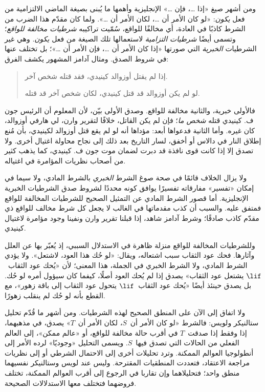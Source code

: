 \documentclass[../../../include/open-logic-section]{subfiles}
\begin{document}


ومن أشهر صيغ «إذا \dots، فإن \dots» الإنجليزية وأهمها ما يُبنى بصيغة
الماضي الالتزامية من فعل \emph{يكون}: «لو كان الأمر أن \dots، لكان
الأمر أن \dots». ولما كان مقدّم هذا الضرب من الشرط كاذبًا في العادة،
أي مخالفًا للواقع، سُمّيت تراكيبه \emph{شرطيات مخالفة للواقع}؛ وتسمى
أيضًا \emph{شرطيات التزامية} لاستعمالها تلك الصيغة من فعل \emph{يكون}.
وهي غير الشرطيات \emph{الخبرية} التي صورتها «إذا كان الأمر أن \dots،
فإن الأمر أن \dots»؛ بل تختلف عنها في شروط الصدق. ومثال آدامز المشهور
يكشف الفرق:
\begin{quote}
  إذا لم يقتل أوزوالد كينيدي، فقد قتله شخص آخر.
  
  لو لم يكن أوزوالد قد قتل كينيدي، لكان شخص آخر قد قتله.
\end{quote}
فالأولى خبرية، والثانية مخالفة للواقع. وصدق الأولى بيّن، لأن المعلوم أن
الرئيس جون ف. كينيدي قتله \emph{شخص ما}؛ فإن لم يكن القاتل، خلافًا
لتقرير وارن، لي هارفي أوزوالد، كان غيره. وأما الثانية فدعواها أبعد:
مؤداها أنه لو لم يقع قتل أوزوالد لكينيدي، بأن مُنع إطلاق النار في دالاس
أو أخفق، لسار التاريخ بعد ذلك إلى نجاح محاولة اغتيال أخرى. ولا تصدق
إلا إذا كانت قوى نافذة قد دبرت لضمان موت جون ف. كينيدي، كما يذهب كثير
من أصحاب نظريات المؤامرة في اغتياله.

ولا يزال الخلاف قائمًا في صحة صوغ الشرط \emph{الخبري} بالشرط المادي،
ولا سيما في إمكان «تفسير» مفارقاته تفسيرًا يوافق كونه محددًا لشروط صدق
الشرطيات الخبرية الإنجليزية. أما قصور الشرط المادي عن التمثيل الصحيح
للشرطيات المخالفة للواقع فمتفق عليه. والسبب أن كذب مقدماتها في الغالب
لا يجعل كل شرط مخالف للواقع ذي مقدّم كاذب صادقًا؛ وشرط آدامز شاهد، إذا
قبلنا تقرير وارن ونفينا وجود مؤامرة لاغتيال كينيدي.

وللشرطيات المخالفة للواقع منزلة ظاهرة في الاستدلال السببي، إذ يُعبّر
بها عن العلل وآثارها. فحك عود الثقاب سبب اشتعاله، ويقال: «لو حُك هذا
العود، لاشتعل». ولا يؤدي الشرط المادي، ولا الشرط الخبري في الجملة، هذا
المعنى؛ لأن «يُحك عود الثقاب~$\lif$ يشتعل عود الثقاب» يصدق إذا لم
يُحك العود أصلًا، كيفما كان سيؤول أمره لو حُك. بل يصدق حينئذ أيضًا
«يُحك عود الثقاب~$\lif$ يتحول عود الثقاب إلى باقة زهور»، مع القطع بأنه
لو حُك لم ينقلب زهورًا.

ولا اتفاق إلى الآن على المنطق الصحيح لهذه الشرطيات. ومن أشهر ما قُدّم
تحليل ستالنيكر ولويس: فالشرط «لو كان الأمر أن~$S$، لكان الأمر أن~$T$»
يصدق، في مذهبهما، إذا وفقط إذا صدقت~$T$ في أقرب حالة مخالفة للواقع، أو
«عالم ممكن»، إلى العالم الفعلي من الحالات التي تصدق فيها~$S$. ويسمى
التحليل «وجوديًا» لرده الأمر إلى أنطولوجيا العوالم الممكنة. وترد تحليلات
أخرى إلى الاحتمال الشرطي أو إلى نظريات مراجعة الاعتقاد، فتعددت المنطقيات
المقترحة. وليس عند لويس وستالنيكر نفسيهما منطق واحد؛ فتحليلاهما وإن
تقاربا في الرجوع إلى أقرب العوالم الممكنة، تختلف فروضهما فتختلف معها
الاستدلالات الصحيحة.
\end{document}
